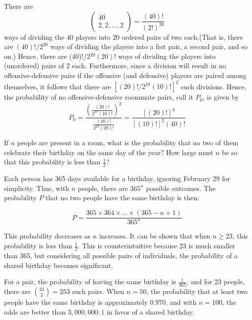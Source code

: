                 \begin{solution}
                There are
                $$\left(\begin{array}{cc}40\\2,2,\ldots,2\end{array}\right)=\frac{(40)!}{(2!)^{20}}$$
                ways of dividing the 40 players into 20 ordered pairs of two each.(That is, there are $(40)!/2^{20}$ ways of dividing the players into a frst pair, a second pair, and so on.) Hence, there are (40)!/2$^{20}(20)!$ ways of dividing the players into (unordered) pairs of 2 each. Furthermore, since a division will result in no offensive-defensive pairs if the offensive (and defensive) players are paired among themselves, it follows that there are $[(20)!/2^{10}(10)!]^{2}$ such divisions. Hence, the probability of no offensive-defensive roommate pairs, call it $P_0$, is given by
                $$P_0=\frac{\left(\frac{(20)!}{2^{10}(10)!}\right)^2}{\frac{(40)!}{2^{20}(20)!}}=\frac{[(20)!]^3}{[(10)!]^2(40)!}$$
                \end{solution}
                \begin{example}
                    If \(n\) people are present in a room, what is the probability that no two of them celebrate their birthday on the same day of the year? How large must \(n\) be so that this probability is less than \(\frac{1}{2}\)?
                \end{example}
                    
                    \begin{solution}
                    Each person has 365 days available for a birthday, ignoring February 29 for simplicity. Thus, with \(n\) people, there are \(365^n\) possible outcomes. The probability \(P\) that no two people have the same birthday is then:
                    
                    \[
                    P = \frac{365 \times 364 \times \ldots \times (365 - n + 1)}{365^n}
                    \]
                    
                    This probability decreases as \(n\) increases. It can be shown that when \(n \geq 23\), this probability is less than \(\frac{1}{2}\). This is counterintuitive because 23 is much smaller than 365, but considering all possible pairs of individuals, the probability of a shared birthday becomes significant.
                    
                    For a pair, the probability of having the same birthday is \(\frac{1}{365}\), and for 23 people, there are \(\binom{23}{2} = 253\) such pairs. When \(n=50\), the probability that at least two people have the same birthday is approximately \(0.970\), and with \(n=100\), the odds are better than \(3,000,000:1\) in favor of a shared birthday.
                    \end{solution}
                    
                


    


















